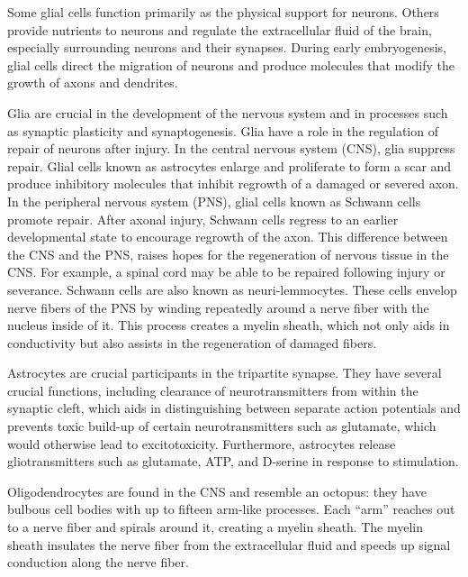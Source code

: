 Some glial cells function primarily as the physical support for neurons. Others provide nutrients to neurons and regulate the extracellular fluid of the brain, especially surrounding neurons and their synapses. During early embryogenesis, glial cells direct the migration of neurons and produce molecules that modify the growth of axons and dendrites.

Glia are crucial in the development of the nervous system and in processes such as synaptic plasticity and synaptogenesis. Glia have a role in the regulation of repair of neurons after injury. In the central nervous system (CNS), glia suppress repair. Glial cells known as astrocytes enlarge and proliferate to form a scar and produce inhibitory molecules that inhibit regrowth of a damaged or severed axon. In the peripheral nervous system (PNS), glial cells known as Schwann cells promote repair. After axonal injury, Schwann cells regress to an earlier developmental state to encourage regrowth of the axon. This difference between the CNS and the PNS, raises hopes for the regeneration of nervous tissue in the CNS. For example, a spinal cord may be able to be repaired following injury or severance. Schwann cells are also known as neuri-lemmocytes. These cells envelop nerve fibers of the PNS by winding repeatedly around a nerve fiber with the nucleus inside of it. This process creates a myelin sheath, which not only aids in conductivity but also assists in the regeneration of damaged fibers.

Astrocytes are crucial participants in the tripartite synapse. They have several crucial functions, including clearance of neurotransmitters from within the synaptic cleft, which aids in distinguishing between separate action potentials and prevents toxic build-up of certain neurotransmitters such as glutamate, which would otherwise lead to excitotoxicity. Furthermore, astrocytes release gliotransmitters such as glutamate, ATP, and D-serine in response to stimulation.

Oligodendrocytes are found in the CNS and resemble an octopus: they have bulbous cell bodies with up to fifteen arm-like processes. Each ``arm'' reaches out to a nerve fiber and spirals around it, creating a myelin sheath. The myelin sheath insulates the nerve fiber from the extracellular fluid and speeds up signal conduction along the nerve fiber.

